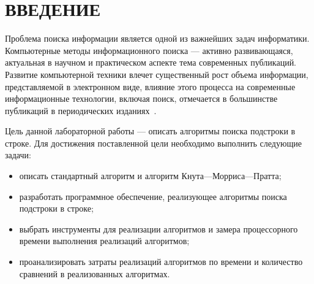 \chapter*{ВВЕДЕНИЕ}

Проблема поиска информации является одной из важнейших задач информатики.
Компьютерные методы информационного поиска --- активно развивающаяся, актуальная в научном и практическом аспекте тема современных публикаций. 
Развитие компьютерной техники влечет существенный рост объема информации, представляемой в электронном виде, влияние этого процесса на современные информационные технологии, включая поиск, отмечается в большинстве публикаций в периодических изданиях~\cite{intro}.



Цель данной лабораторной работы --- описать алгоритмы поиска подстроки в строке.
Для достижения поставленной цели необходимо выполнить следующие задачи:
\begin{itemize}
	\item описать стандартный алгоритм и алгоритм Кнута---Морриса---Пратта;
	\item разработать программное обеспечение, реализующее алгоритмы поиска подстроки в строке;
	\item выбрать инструменты для реализации алгоритмов и замера процессорного времени выполнения реализаций алгоритмов;
	\item проанализировать затраты реализаций алгоритмов по времени и количество сравнений в реализованных алгоритмах.
\end{itemize}
